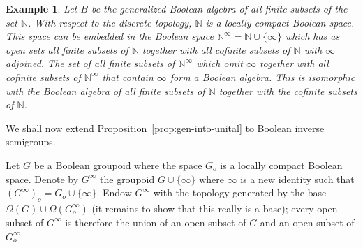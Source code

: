 \documentclass[a4paper]{amsart}
\newtheorem{example}[theorem]{Example}
\begin{document}
\begin{example}
{\em Let $B$ be the generalized Boolean algebra of all finite subsets of the set $\mathbb{N}$.
With respect to the discrete topology, $\mathbb{N}$ is a locally compact Boolean space. 
This space can be embedded in the Boolean space $\mathbb{N}^{\infty} = \mathbb{N} \cup \{\infty\}$ which has as open sets
all finite subsets of $\mathbb{N}$ together with all cofinite subsets of $\mathbb{N}$ with $\infty$ adjoined.
The set of all finite subsets of $\mathbb{N}^{\infty}$ which omit $\infty$ together with all cofinite subsets of $\mathbb{N}^{\infty}$
that contain $\infty$ form a Boolean algebra.
This is isomorphic with the Boolean algebra of all finite subsets of $\mathbb{N}$ together with the cofinite subsets of $\mathbb{N}$.}
\end{example}

We shall now extend Proposition~\ref{prop:gen-into-unital} to Boolean inverse semigroups.

Let $G$ be a Boolean groupoid where the space $G_{o}$ is a locally compact Boolean space.
Denote by $G^{\infty}$ the groupoid $G \cup \{\infty\}$ where $\infty$ is a new identity such
that $(G^{\infty})_{o} = G_{o} \cup \{\infty\}$.
Endow $G^{\infty}$ with the topology generated by the base $\Omega (G) \cup \Omega (G_{o}^{\infty})$
(it remains to show that this really is a base);
every open subset of $G^{\infty}$ is therefore the union of an open subset of $G$ and an open subset of $G_{o}^{\infty}$.
\end{document}
